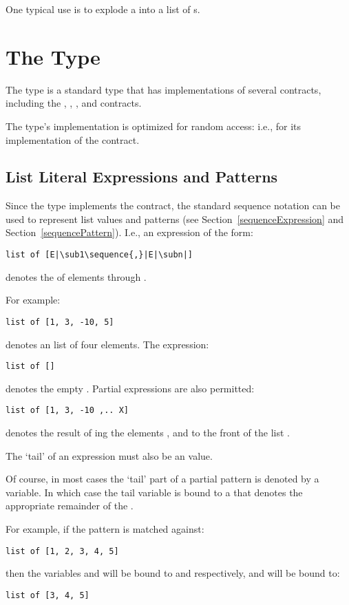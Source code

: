 \begin{aside}
One typical use is to explode a  into a  list of s.\end{aside}

\section{The  Type}
\label{arrayType}
The  type is a standard type that has implementations of several contracts, including the , , ,  and  contracts.

The  type's implementation is optimized for random access: i.e., for its implementation of the  contract.

\subsection{List Literal Expressions and Patterns}
\label{listLiteral}
Since the  type implements the  contract, the standard sequence notation can be used to represent list values and patterns (see Section~\vref{sequenceExpression} and Section~\vref{sequencePattern}). I.e., an expression of the form:
\begin{lstlisting}[escapechar=|]
list of [E|\sub1\sequence{,}|E|\subn|]
\end{lstlisting}
denotes the  of elements  through .

For example:
\begin{lstlisting}
list of [1, 3, -10, 5]
\end{lstlisting}
denotes an list of four  elements. The expression:
\begin{lstlisting}
list of []
\end{lstlisting}
denotes the empty . Partial  expressions are also permitted:
\begin{lstlisting}
list of [1, 3, -10 ,.. X]
\end{lstlisting}
denotes the result of ing the elements ,  and  to the front of the list .
\begin{aside}
The `tail' of an  expression must also be an  value.
\end{aside}

\begin{aside}
Of course, in most cases the `tail' part of a partial  pattern is denoted by a variable. In which case the tail variable is bound to a  that denotes the appropriate remainder of the .

For example, if the pattern  is matched against:
\begin{lstlisting}
list of [1, 2, 3, 4, 5]
\end{lstlisting}
then the variables  and  will be bound to  and  respectively, and  will be bound to:
\begin{lstlisting}
list of [3, 4, 5]
\end{lstlisting}
\end{aside}

